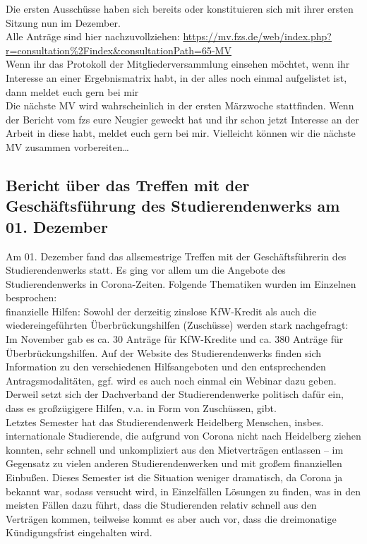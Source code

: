 Die ersten Ausschüsse haben sich bereits oder konstituieren sich mit ihrer ersten Sitzung nun im Dezember.\\
Alle Anträge sind hier nachzuvollziehen: \url{https://mv.fzs.de/web/index.php?r=consultation%2Findex&consultationPath=65-MV}\\
Wenn ihr das Protokoll der Mitgliederversammlung einsehen möchtet, wenn ihr Interesse an einer Ergebnismatrix habt, in der alles noch einmal aufgelistet ist, dann meldet euch gern bei mir\\
Die nächste MV wird wahrscheinlich in der ersten Märzwoche stattfinden. Wenn der Bericht vom fzs eure Neugier geweckt hat und ihr schon jetzt Interesse an der Arbeit in diese habt, meldet euch gern bei mir. Vielleicht können wir die nächste MV zusammen vorbereiten…

\subsection{Bericht über das Treffen mit der Geschäftsführung des Studierendenwerks am 01. Dezember}
Am 01. Dezember fand das allsemestrige Treffen mit der Geschäftsführerin des Studierendenwerks statt. Es ging vor allem um die Angebote des Studierendenwerks in Corona-Zeiten. Folgende Thematiken wurden im Einzelnen besprochen:\\
finanzielle Hilfen: Sowohl der derzeitig zinslose KfW-Kredit als auch die wiedereingeführten Überbrückungshilfen (Zuschüsse) werden stark nachgefragt: Im November gab es ca. 30 Anträge für KfW-Kredite und ca. 380 Anträge für Überbrückungshilfen. Auf der Website des Studierendenwerks finden sich Information zu den verschiedenen Hilfsangeboten und den entsprechenden Antragsmodalitäten, ggf. wird es auch noch einmal ein Webinar dazu geben. Derweil setzt sich der Dachverband der Studierendenwerke politisch dafür ein, dass es großzügigere Hilfen, v.a. in Form von Zuschüssen, gibt.\\
Letztes Semester hat das Studierendenwerk Heidelberg Menschen, insbes. internationale Studierende, die aufgrund von Corona nicht nach Heidelberg ziehen konnten, sehr schnell und unkompliziert aus den Mietverträgen entlassen – im Gegensatz zu vielen anderen Studierendenwerken und mit großem finanziellen Einbußen. Dieses Semester ist die Situation weniger dramatisch, da Corona ja bekannt war, sodass versucht wird, in Einzelfällen Lösungen zu finden, was in den meisten Fällen dazu führt, dass die Studierenden relativ schnell aus den Verträgen kommen, teilweise kommt es aber auch vor, dass die dreimonatige Kündigungsfrist eingehalten wird.\\
